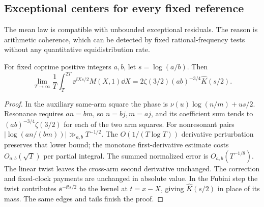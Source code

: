 \subsection{Exceptional centers for every fixed reference}
The mean law is compatible with unbounded exceptional residuals.
The reason is arithmetic coherence, which can be detected by fixed
rational-frequency tests without any quantitative equidistribution
rate.

\begin{lemma}\label{lem:twisted-moments}
For fixed coprime positive integers \(a,b\), let \(s=\log(a/b)\).
Then
\begin{equation}\label{eq:twisted-moment}
 \lim_{T\to\infty}\frac1T\int_T^{2T}\ee^{\ii Xs/2}M(X,1)\dd X
     =2\zeta(3/2)(ab)^{-3/4}\widehat K(s/2).
\end{equation}
\end{lemma}
\begin{proof}
In the auxiliary same-arm square the phase is
\(\nu(u)\log(n/m)+us/2\). Resonance requires \(an=bm\),
so \(n=bj,m=aj\), and its coefficient sum tends to
\((ab)^{-3/4}\zeta(3/2)\) for each of the two arm squares.
For nonresonant pairs
\(|\log(an/(bm))|\gg_{a,b}T^{-1/2}\).
The \(O(1/(T\log T))\) derivative perturbation preserves that
lower bound; the monotone first-derivative estimate costs
\(O_{a,b}(\sqrt T)\) per partial integral. The summed normalized
error is \(O_{a,b}(T^{-1/8})\). The linear twist leaves the
cross-arm second derivative unchanged. The correction and fixed-clock
payments are unchanged in absolute value. In the Fubini step the
twist contributes \(\ee^{-\ii ts/2}\) to the kernel at \(t=x-X\),
giving \(\widehat K(s/2)\) in place of its mass. The same edges
and tails finish the proof.
\end{proof}

